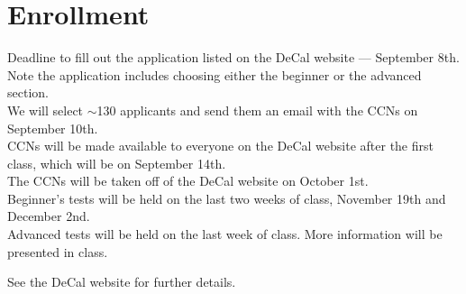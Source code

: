 \documentclass[11pt]{article}
\begin{document}
\section*{Enrollment}
Deadline to fill out the application listed on the DeCal website — September 8th.\\
Note the application includes choosing either the beginner or the advanced section.\\
We will select $\sim$130 applicants and send them an email with the CCNs on September 10th.\\
CCNs will be made available to everyone on the DeCal website after the first class, which will be on September 14th.\\
The CCNs will be taken off of the DeCal website on October 1st.\\
Beginner’s tests will be held on the last two weeks of class, November 19th and December 2nd.\\
Advanced tests will be held on the last week of class. More information will be presented in class.

See the DeCal website for further details.
\end{document}
